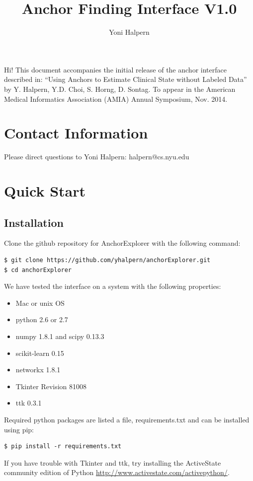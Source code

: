 \documentclass[12pt]{article}
\title{Anchor Finding Interface V1.0}
\author{Yoni Halpern}
\begin{document}
 
\maketitle{}
 

Hi! This document accompanies the initial release of the anchor interface described in: ``Using Anchors to Estimate Clinical State without Labeled Data'' by Y. Halpern, Y.D. Choi, S. Horng, D. Sontag. To appear in the American Medical Informatics Association (AMIA) Annual Symposium, Nov. 2014. 


\section{Contact Information}
Please direct questions to Yoni Halpern: halpern@cs.nyu.edu

\section{Quick Start}

\subsection{Installation}
Clone the github repository for AnchorExplorer with the following command:

\begin{verbatim}
$ git clone https://github.com/yhalpern/anchorExplorer.git
$ cd anchorExplorer
\end{verbatim}

We have tested the interface on a system with the following properties:
\begin{itemize}
\item Mac or unix OS
\item python 2.6 or 2.7
\item numpy 1.8.1 and scipy 0.13.3
\item scikit-learn 0.15
\item networkx 1.8.1
\item Tkinter Revision 81008
\item ttk 0.3.1
\end{itemize}

Required python packages are listed a file, requirements.txt and can be installed using pip:

\begin{verbatim}
$ pip install -r requirements.txt
\end{verbatim}

If you have trouble with Tkinter and ttk, try installing the ActiveState community edition of Python \url{http://www.activestate.com/activepython/}.
\end{document}

